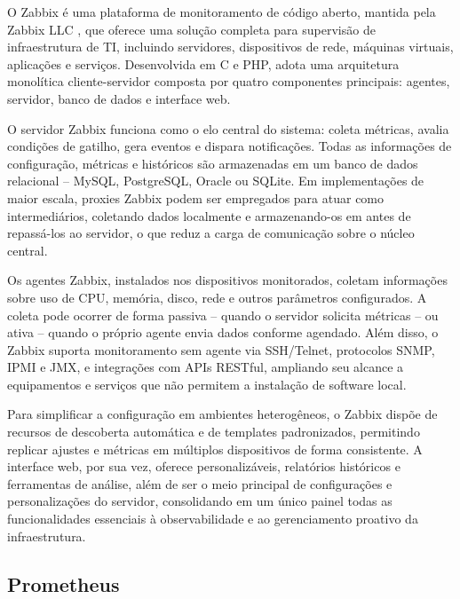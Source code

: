 O Zabbix é uma plataforma de monitoramento de código aberto, mantida pela Zabbix LLC \citep{zabbix2025}, que oferece uma solução completa para supervisão de infraestrutura de TI, incluindo servidores, dispositivos de rede, máquinas virtuais, aplicações e serviços. Desenvolvida em C e PHP, adota uma arquitetura monolítica cliente-servidor composta por quatro componentes principais: agentes, servidor, banco de dados e interface web.

O servidor Zabbix funciona como o elo central do sistema: coleta métricas, avalia condições de gatilho, gera eventos e dispara notificações. Todas as informações de configuração, métricas e históricos são armazenadas em um banco de dados relacional -- MySQL, PostgreSQL, Oracle ou SQLite. Em implementações de maior escala, proxies Zabbix podem ser empregados para atuar como intermediários, coletando dados localmente e armazenando-os em  antes de repassá-los ao servidor, o que reduz a carga de comunicação sobre o núcleo central.

Os agentes Zabbix, instalados nos dispositivos monitorados, coletam informações sobre uso de CPU, memória, disco, rede e outros parâmetros configurados. A coleta pode ocorrer de forma passiva -- quando o servidor solicita métricas -- ou ativa -- quando o próprio agente envia dados conforme agendado. Além disso, o Zabbix suporta monitoramento sem agente via SSH/Telnet, protocolos SNMP, IPMI e JMX, e integrações com APIs RESTful, ampliando seu alcance a equipamentos e serviços que não permitem a instalação de software local.

Para simplificar a configuração em ambientes heterogêneos, o Zabbix dispõe de recursos de descoberta automática e de templates padronizados, permitindo replicar ajustes e métricas em múltiplos dispositivos de forma consistente. A interface web, por sua vez, oferece  personalizáveis, relatórios históricos e ferramentas de análise, além de ser o meio principal de configurações e personalizações do servidor, consolidando em um único painel todas as funcionalidades essenciais à observabilidade e ao gerenciamento proativo da infraestrutura.

\subsection{Prometheus}
\label{subsection:Prometheus}

